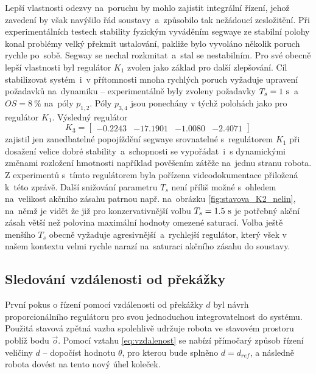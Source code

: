 \documentclass[conference]{IEEEtran}
\begin{document}
Lepší vlastnosti odezvy na~poruchu by mohlo zajistit integrální řízení, jehož zavedení by však navýšilo řád soustavy~a~způsobilo tak nežádoucí zesložitění.
Při experimentálních testech stability fyzickým vyváděním segwaye ze stabilní polohy konal problémy velký překmit ustalování, pakliže bylo vyvoláno
několik poruch rychle po~sobě. Segway se nechal rozkmitat~a~stal se nestabilním. Pro své obecně lepší vlastnosti byl regulátor $K_1$ zvolen jako základ
pro další zlepšování. Cíl stabilizovat systém~i~v přítomnosti mnoha rychlých poruch vyžaduje upravení požadavků na~dynamiku -- experimentálně byly zvoleny
požadavky $T_s = 1~\text{\si{\second}}$~a~$OS = 8~\%$ na~póly $p_{1,2}$. Póly $p_{3,4}$ jsou ponechány v týchž polohách jako pro regulátor $K_1$.
Výsledný regulátor
\begin{equation*}
    K_3 = \begin{bmatrix}
        -0.2243 & -17.1901 &  -1.0080 &  -2.4071
    \end{bmatrix}
\end{equation*}
zajistil jen zanedbatelné popojíždění segwaye srovnatelné s~regulátorem $K_1$ při dosažení velice dobré stability~a~schopnosti se vypořádat~i~s dynamickými změnami rozložení
hmotnosti například pověšením zátěže na~jednu stranu robota. Z experimentů s~tímto regulátorem byla pořízena videodokumentace přiložená k~této zprávě.
Další snižování parametru $T_s$ není příliš možné s~ohledem na~velikost akčního zásahu patrnou např. na~obrázku \ref{fig:stavova_K2_nelin}, na~němž je vidět že již pro
konzervativnější volbu $T_s = 1.5~\text{\si{\second}}$ je potřebný akční zásah větší než polovina maximální hodnoty omezené saturací.   
Volba ještě menšího $T_s$ obecně vyžaduje agresivnější~a~rychlejší regulátor, který všek v našem kontextu velmi rychle narazí na~saturaci akčního zásahu do soustavy.


\subsection{Sledování vzdálenosti od překážky}

První pokus o řízení pomocí vzdálenosti od překážky $d$ byl návrh proporcionálního regulátoru pro svou jednoduchou integrovatelnost do systému.
Použitá stavová zpětná vazba spolehlivě udržuje robota ve stavovém prostoru poblíž bodu $\vec{o}$. Pomocí vztahu \eqref{eq:vzdalenost} se nabízí přímočarý
způsob řízení veličiny $d$ -- dopočíst hodnotu $\theta$, pro kterou bude splněno $d = d_{ref}$, a následně robota dovést na tento nový úhel koleček. 
\end{document}
